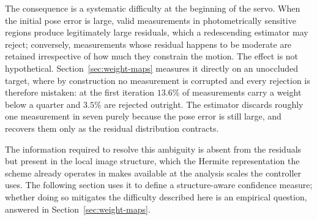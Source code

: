 The consequence is a systematic difficulty at the beginning of the servo. When
the initial pose error is large, valid measurements in photometrically
sensitive regions produce legitimately large residuals, which a redescending
estimator may reject; conversely, measurements whose residual happens to be
moderate are retained irrespective of how much they constrain the motion.
The effect is not hypothetical. Section~\ref{sec:weight-maps} measures it
directly on an unoccluded target, where by construction no measurement is
corrupted and every rejection is therefore mistaken: at the first iteration
$13.6\%$ of measurements carry a weight below a quarter and $3.5\%$ are
rejected outright. The estimator discards roughly one measurement in seven
purely because the pose error is still large, and recovers them only as the
residual distribution contracts.

The information required to resolve this ambiguity is absent from the
residuals but present in the local image structure, which the Hermite
representation the scheme already operates in makes available at the analysis
scales the controller uses. The following section uses it to define a
structure-aware confidence measure; whether doing so mitigates the difficulty
described here is an empirical question, answered in
Section~\ref{sec:weight-maps}.


